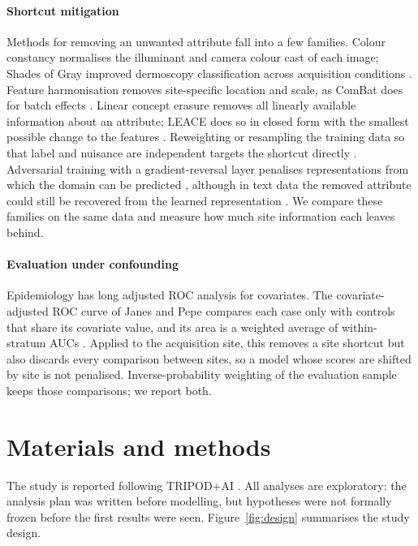 \documentclass[preprint,12pt]{elsarticle}
\begin{document}
\paragraph{Shortcut mitigation} Methods for removing an unwanted attribute fall into a few families. Colour constancy normalises the illuminant and camera colour cast of each image; Shades of Gray \cite{finlayson2004shades} improved dermoscopy classification across acquisition conditions \cite{barata2015colour}. Feature harmonisation removes site-specific location and scale, as ComBat does for batch effects \cite{johnson2007combat}. Linear concept erasure removes all linearly available information about an attribute; LEACE does so in closed form with the smallest possible change to the features \cite{belrose2023leace}. Reweighting or resampling the training data so that label and nuisance are independent targets the shortcut directly \cite{makar2022causally}. Adversarial training with a gradient-reversal layer penalises representations from which the domain can be predicted \cite{ganin2016dann}, although in text data the removed attribute could still be recovered from the learned representation \cite{elazar2018adversarial}. We compare these families on the same data and measure how much site information each leaves behind.

\paragraph{Evaluation under confounding} Epidemiology has long adjusted ROC analysis for covariates. The covariate-adjusted ROC curve of Janes and Pepe compares each case only with controls that share its covariate value, and its area is a weighted average of within-stratum AUCs \cite{janes2008adjusting}. Applied to the acquisition site, this removes a site shortcut but also discards every comparison between sites, so a model whose scores are shifted by site is not penalised. Inverse-probability weighting of the evaluation sample keeps those comparisons; we report both.

\section{Materials and methods}
\label{sec:methods}

The study is reported following TRIPOD+AI \cite{collins2024tripodai}. All analyses are exploratory: the analysis plan was written before modelling, but hypotheses were not formally frozen before the first results were seen. Figure~\ref{fig:design} summarises the study design.
\end{document}
